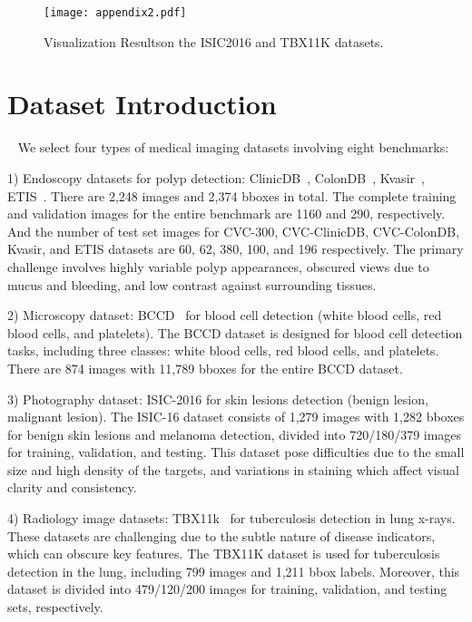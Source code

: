 \begin{figure}[ht]
  \centering
  \texttt{[image: appendix2.pdf]}
  \caption{Visualization Resultson the ISIC2016 and TBX11K datasets.}
  \label{fig:vis}
\end{figure}


\section{Dataset Introduction}~\label{app:dataset_intro}
We select four types of medical imaging datasets involving eight benchmarks: 

1) Endoscopy datasets for polyp detection: ClinicDB~\cite{cvc-clinicDB1, cvc-clinicDB2}, ColonDB~\cite{cvc-colondb}, Kvasir~\cite{kvasir}, ETIS~\cite{ETIS}.
There are 2,248 images and 2,374 bboxes in total.
The complete training and validation images for the entire benchmark are 1160 and 290, respectively. And the number of test set images for CVC-300, CVC-ClinicDB, CVC-ColonDB, Kvasir,
and ETIS datasets are 60, 62, 380, 100, and 196 respectively. The primary challenge involves highly variable polyp appearances, obscured views due to mucus and bleeding, and low contrast against surrounding tissues. 

2) Microscopy dataset: BCCD~\cite{BCCD} for blood cell detection
(white blood cells, red blood cells, and platelets).  The BCCD dataset is designed for blood cell detection tasks, including
three classes: white blood cells, red blood cells, and platelets. There are 874 images with 11,789
bboxes for the entire BCCD dataset.

3) Photography dataset: ISIC-2016 for skin lesions detection (benign lesion, malignant lesion). 
The ISIC-16 dataset consists of 1,279 images with
1,282 bboxes for benign skin lesions and melanoma detection, divided into 720/180/379 images for training, validation, and testing. This dataset pose difficulties due to the small size and high density of the targets, and variations in staining which affect visual clarity and consistency. 

4) Radiology image datasets: TBX11k~\cite{TBX11k} for tuberculosis detection in lung x-rays. These datasets are challenging due to the subtle nature of disease indicators, which can obscure key features. The TBX11K dataset
is used for tuberculosis detection in the lung, including 799 images and 1,211 bbox labels. Moreover,
this dataset is divided into 479/120/200 images for training, validation, and testing sets, respectively.


